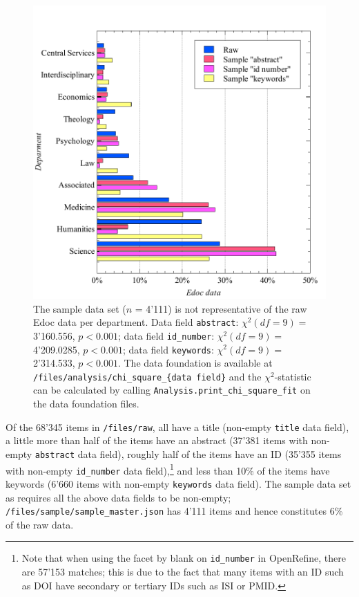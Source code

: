\begin{figure}
\centering
\includegraphics{images/chi_square_selection_fields.pdf}
\caption{The sample data set (\(n\) = 4'111) is not representative of
the raw Edoc data per department. Data field \texttt{abstract}:
\(\chi^2 (df=9) =\) 3'160.556, \(p < 0.001\); data field
\texttt{id\_number}: \(\chi^2 (df=9) =\) 4'209.0285, \(p < 0.001\); data
field \texttt{keywords}: \(\chi^2 (df=9) =\) 2'314.533, \(p < 0.001\).
The data foundation is available at
\texttt{/files/analysis/chi\_square\_\{data\ field\}} and the
\(\chi^2\)-statistic can be calculated by calling
\texttt{Analysis.print\_chi\_square\_fit} on the data foundation files.}
\end{figure}

Of the 68'345 items in \texttt{/files/raw}, all have a title (non-empty
\texttt{title} data field), a little more than half of the items have an
abstract (37'381 items with non-empty \texttt{abstract} data field),
roughly half of the items have an ID (35'355 items with non-empty
\texttt{id\_number} data field),\footnote{Note that when using the facet
  by blank on \texttt{id\_number} in OpenRefine, there are 57'153
  matches; this is due to the fact that many items with an ID such as
  DOI have secondary or tertiary IDs such as ISI or PMID.} and less than
10\% of the items have keywords (6'660 items with non-empty
\texttt{keywords} data field). The sample data set as requires all the
above data fields to be non-empty;
\texttt{/files/sample/sample\_master.json} has 4'111 items and hence
constitutes 6\% of the raw data.

